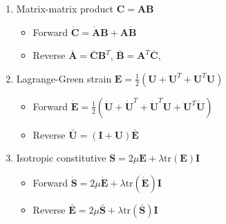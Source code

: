 \documentclass{article}
\begin{document}
\begin{enumerate}
\item Matrix-matrix product $\mathbf{C} = \mathbf{A} \mathbf{B}$ 
\begin{itemize}
\item Forward $\dot{\mathbf{C}} = \dot{\mathbf{A}} \mathbf{B} + \mathbf{A} \dot{\mathbf{B}}$
\item Reverse $\bar{\mathbf{A}} = \bar{\mathbf{C}} \mathbf{B}^{T}$,  $\bar{\mathbf{B}} = \mathbf{A}^{T} \bar{\mathbf{C}}$, 
\end{itemize}

\item Lagrange-Green strain $\mathbf{E} = \frac{1}{2} \left( \mathbf{U} + \mathbf{U}^{T} + \mathbf{U}^{T} \mathbf{U} \right)$
\begin{itemize}
\item Forward $\dot{\mathbf{E}} = \frac{1}{2} \left( \dot{\mathbf{U}} + \dot{\mathbf{U}}^{T} + \dot{\mathbf{U}}^{T} \mathbf{U} + \mathbf{U}^{T} \dot{\mathbf{U}} \right)$
\item Reverse $\bar{\mathbf{U}} = (\mathbf{I} + \mathbf{U}) \bar{\mathbf{E}}$
\end{itemize}

\item Isotropic constitutive $\mathbf{S} = 2 \mu \mathbf{E} + \lambda \text{tr}(\mathbf{E}) \mathbf{I}$
\begin{itemize}
\item Forward $\dot{\mathbf{S}} = 2 \mu \dot{\mathbf{E}} + \lambda \text{tr}(\dot{\mathbf{E}}) \mathbf{I}$
\item Reverse $\bar{\mathbf{E}} = 2 \mu \bar{\mathbf{S}} + \lambda \text{tr}(\bar{\mathbf{S}}) \mathbf{I}$
\end{itemize}

\end{enumerate}
\end{document}
